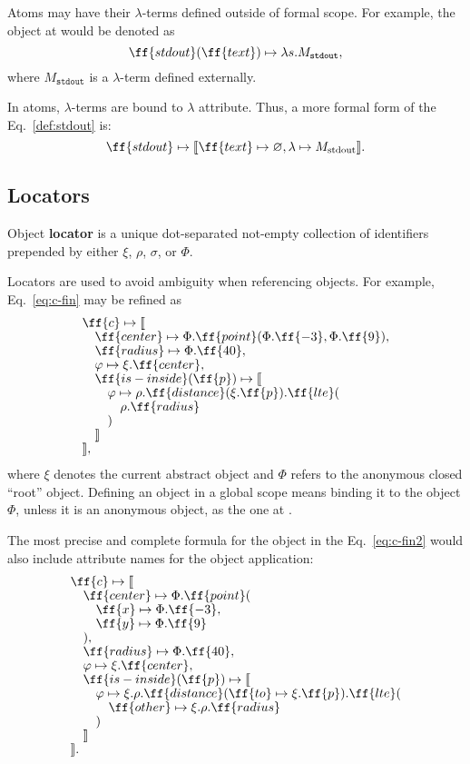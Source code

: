 Atoms may have their $\lambda$-terms defined outside of \phic{} formal scope.
For example, the object at  would be denoted as
\begin{equation}\label{def:stdout}
\ff{stdout}(\ff{text}) \mapsto \lambda s.M_\texttt{stdout},
\end{equation}
where $M_\texttt{stdout}$ is a $\lambda$-term defined externally.

In atoms, $\lambda$-terms are bound to $\lambda$ attribute.
Thus, a more formal form of the Eq.~\ref{def:stdout} is:
\begin{equation*}
\ff{stdout} \mapsto \llbracket \ff{text} \mapsto \varnothing, \lambda \mapsto M_\text{stdout} \rrbracket.
\end{equation*}

\subsection{Locators}

\begin{eodefinition}\label{def:locator}
Object \textbf{locator} is a unique dot-separated not-empty
collection of identifiers prepended by either $\xi$, $\rho$, $\sigma$, or $\Phi$.
\end{eodefinition}

Locators are used to avoid ambiguity when referencing objects.
For example, Eq.~\ref{eq:c-fin} may be refined as
\begin{equation}
\begin{split}
& \ff{c} \mapsto \llbracket \br
& \quad \ff{center} \mapsto \Phi.\ff{point}(\Phi.\ff{-3}, \Phi.\ff{9}), \br
& \quad \ff{radius} \mapsto \Phi.\ff{40}, \br
& \quad \varphi \mapsto \xi.\ff{center}, \br
& \quad \ff{is-inside}(\ff{p}) \mapsto \llbracket \br
& \quad \quad \varphi \mapsto \rho.\ff{distance}(\xi.\ff{p}).\ff{lte}( \br
& \quad \quad \quad \rho.\ff{radius} \br
& \quad \quad ) \br
& \quad \rrbracket \br
& \rrbracket,
\end{split}
\end{equation}
where $\xi$ denotes the current abstract object
and $\Phi$ refers to the anonymous closed ``root'' object.
Defining an object in a global scope
means binding it to the object $\Phi$, unless it is an anonymous
object, as the one at .

The most precise and complete formula for the object in the
Eq.~\ref{eq:c-fin2} would also include attribute names for
the object application:
\begin{equation}
\begin{split}
& \ff{c} \mapsto \llbracket \br
& \quad \ff{center} \mapsto \Phi.\ff{point}( \br
& \quad \quad \ff{x} \mapsto \Phi.\ff{-3}, \br
& \quad \quad \ff{y} \mapsto \Phi.\ff{9} \br
& \quad ), \br
& \quad \ff{radius} \mapsto \Phi.\ff{40}, \br
& \quad \varphi \mapsto \xi.\ff{center}, \br
& \quad \ff{is-inside}(\ff{p}) \mapsto \llbracket \br
& \quad \quad \varphi \mapsto \xi.\rho.\ff{distance}(\ff{to} \mapsto \xi.\ff{p}).\ff{lte}( \br
& \quad \quad \quad \ff{other} \mapsto \xi.\rho.\ff{radius} \br
& \quad \quad ) \br
& \quad \rrbracket \br
& \rrbracket.
\end{split}
\end{equation}

